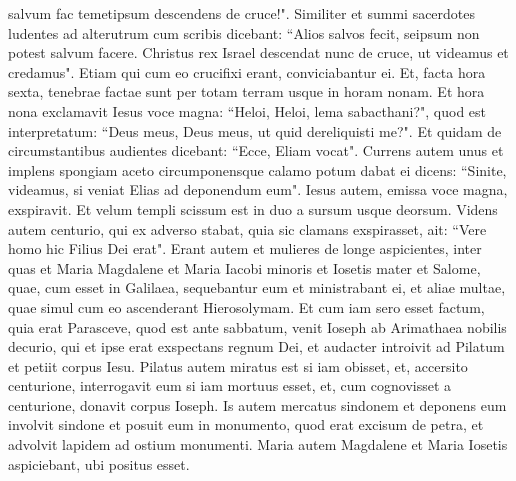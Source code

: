 \begin{biblechapter}
\verse salvum fac temetipsum descendens de cruce!". 
\verse Similiter et summi sacerdotes ludentes ad alterutrum cum scribis dicebant: “Alios salvos fecit, seipsum non potest salvum facere. 
\verse Christus rex Israel descendat nunc de cruce, ut videamus et credamus". Etiam qui cum eo crucifixi erant, conviciabantur ei. 
\verse Et, facta hora sexta, tenebrae factae sunt per totam terram usque in horam nonam. 
\verse Et hora nona exclamavit Iesus voce magna: “Heloi, Heloi, lema sabacthani?", quod est interpretatum: “Deus meus, Deus meus, ut quid dereliquisti me?". 
\verse Et quidam de circumstantibus audientes dicebant: “Ecce, Eliam vocat". 
\verse Currens autem unus et implens spongiam aceto circumponensque calamo potum dabat ei dicens: “Sinite, videamus, si veniat Elias ad deponendum eum". 
\verse Iesus autem, emissa voce magna, exspiravit. 
\verse Et velum templi scissum est in duo a sursum usque deorsum. 
\verse Videns autem centurio, qui ex adverso stabat, quia sic clamans exspirasset, ait: “Vere homo hic Filius Dei erat". 
\verse Erant autem et mulieres de longe aspicientes, inter quas et Maria Magdalene et Maria Iacobi minoris et Iosetis mater et Salome, 
\verse quae, cum esset in Galilaea, sequebantur eum et ministrabant ei, et aliae multae, quae simul cum eo ascenderant Hierosolymam. 
\verse Et cum iam sero esset factum, quia erat Parasceve, quod est ante sabbatum,  
\verse venit Ioseph ab Arimathaea nobilis decurio, qui et ipse erat exspectans regnum Dei, et audacter introivit ad Pilatum et petiit corpus Iesu. 
\verse Pilatus autem miratus est si iam obisset, et, accersito centurione, interrogavit eum si iam mortuus esset, 
\verse et, cum cognovisset a centurione, donavit corpus Ioseph. 
\verse Is autem mercatus sindonem et deponens eum involvit sindone et posuit eum in monumento, quod erat excisum de petra, et advolvit lapidem ad ostium monumenti. 
\verse Maria autem Magdalene et Maria Iosetis aspiciebant, ubi positus esset. 
\end{biblechapter}

